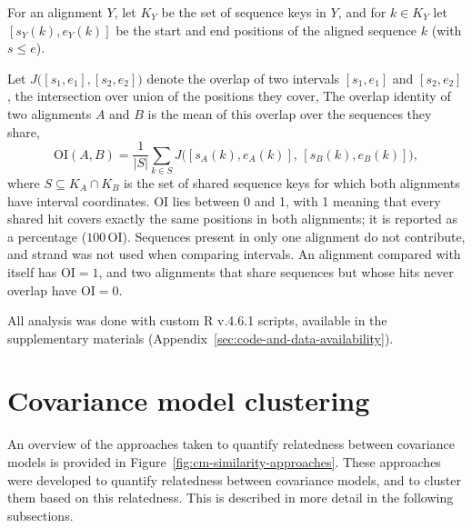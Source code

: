 For an alignment $Y$, let $K_Y$ be the set of sequence keys in $Y$, and for $k \in K_Y$ let $[s_Y(k), e_Y(k)]$ be the start and end positions of the aligned sequence $k$ (with $s \le e$).
 
Let $J\bigl([s_1, e_1], [s_2, e_2]\bigr)$ denote the overlap of two intervals $[s_1, e_1]$ and $[s_2, e_2]$, the intersection over union of the positions they cover,
The overlap identity of two alignments $A$ and $B$ is the mean of this overlap over the sequences they share,
\begin{equation}
  \label{eq:overlap-identity}
  \mathrm{OI}(A, B) = \frac{1}{|S|} \sum_{k \in S}
  J\bigl([s_A(k), e_A(k)],\, [s_B(k), e_B(k)]\bigr),
\end{equation}
where $S \subseteq K_A \cap K_B$ is the set of shared sequence keys for which both alignments have interval coordinates.
$\mathrm{OI}$ lies between 0 and 1, with 1 meaning that every shared hit covers exactly the same positions in both alignments; it is reported as a percentage ($100\,\mathrm{OI}$).
Sequences present in only one alignment do not contribute, and strand was not used when comparing intervals.
An alignment compared with itself has $\mathrm{OI} = 1$, and two alignments that share sequences but whose hits never overlap have $\mathrm{OI} = 0$.

All analysis was done with custom R v.4.6.1 scripts, available in the supplementary materials (Appendix~\ref{sec:code-and-data-availability}).


\section{Covariance model clustering}
\label{sec:cm-simile}

An overview of the approaches taken to quantify relatedness between covariance models is provided in Figure~\ref{fig:cm-similarity-approaches}.
These approaches were developed to quantify relatedness between covariance models, and to cluster them based on this relatedness.
This is described in more detail in the following subsections.

